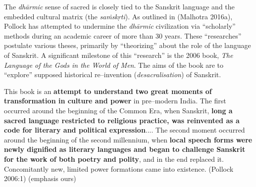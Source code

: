 The \textit{dhārmic} sense of sacred is closely tied to the Sanskrit language and the embedded cultural matrix (the \textit{saṁskṛti}). As outlined in (Malhotra 2016a), Pollock has attempted to undermine the \textit{dhārmic} civilization via “scholarly” methods during an academic career of more than 30 years. These “researches” postulate various theses, primarily by “theorizing” about the role of the language of Sanskrit. A significant milestone of this “research” is the 2006 book, \textit{The Language of the Gods in the World of Men}. The aims of the book are to “explore” supposed historical re–invention (\textit{desacralisation}) of Sanskrit.

\begin{myquote}
This book is an \textbf{attempt to understand two great moments of transformation in culture and power} in pre–modern India. The first occurred around the beginning of the Common Era, when Sanskrit, \textbf{long a sacred language restricted to religious practice, was reinvented as a code for literary and political expression}.... The second moment occurred around the beginning of the second millennium, when \textbf{local speech forms were newly dignified as literary languages and began to challenge Sanskrit for the work of both poetry and polity}, and in the end replaced it. Concomitantly new, limited power formations came into existence. \hfill (Pollock 2006:1) (emphasis ours)
\end{myquote}

